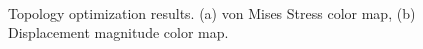                   \begin{figure}[hbt!]
\centering            
{}
      \\                                                      
                                  \caption{Topology optimization results. (a)  von Mises Stress color map, (b) Displacement magnitude color map. \label{fig2.10b}} 
                                \end{figure}
                \clearpage
